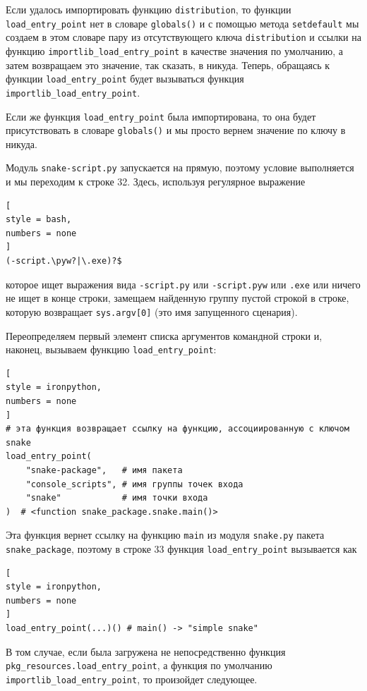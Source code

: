 \documentclass[%
	11pt,
	a4paper,
	utf8,
		]{article}
\begin{document}
Если удалось импортировать функцию \texttt{distribution}, то функции \texttt{load\_entry\_point} нет в словаре \texttt{globals()} и с помощью метода \texttt{setdefault} мы создаем в этом словаре пару из отсутствующего ключа \texttt{distribution} и ссылки на функцию \texttt{importlib\_load\_entry\_point} в качестве значения по умолчанию, а затем возвращаем это значение, так сказать, в никуда. Теперь, обращаясь к функции \texttt{load\_entry\_point} будет вызываться функция \texttt{importlib\_load\_entry\_point}.

Если же функция \texttt{load\_entry\_point} была импортирована, то она будет присутствовать в словаре \texttt{globals()} и мы просто вернем значение по ключу в никуда.

Модуль \texttt{snake-script.py} запускается на прямую, поэтому условие выполняется и мы переходим к строке 32. Здесь, используя регулярное выражение
\begin{lstlisting}[
style = bash,
numbers = none
]
(-script.\pyw?|\.exe)?$
\end{lstlisting}
которое ищет выражения вида \texttt{-script.py} или \texttt{-script.pyw} или \texttt{.exe} или ничего не ищет в конце строки, замещаем найденную группу пустой строкой в строке, которую возвращает \texttt{sys.argv[0]} (это имя запущенного сценария).

Переопределяем первый элемент списка аргументов командной строки и, наконец, вызываем функцию \texttt{load\_entry\_point}:
\begin{lstlisting}[
style = ironpython,
numbers = none	
]
# эта функция возвращает ссылку на функцию, ассоциированную с ключом snake
load_entry_point(
    "snake-package",   # имя пакета
    "console_scripts", # имя группы точек входа 
    "snake"            # имя точки входа
)  # <function snake_package.snake.main()>
\end{lstlisting}

Эта функция вернет ссылку на функцию \texttt{main} из модуля \texttt{snake.py} пакета \texttt{snake\_package}, поэтому в строке 33 функция \texttt{load\_entry\_point} вызывается как
\begin{lstlisting}[
style = ironpython,
numbers = none	
]
load_entry_point(...)() # main() -> "simple snake"
\end{lstlisting}

В том случае, если была загружена не непосредственно функция \texttt{pkg\_resources.load\_entry\_point}, а функция по умолчанию \texttt{importlib\_load\_entry\_point}, то произойдет следующее.
\end{document}
